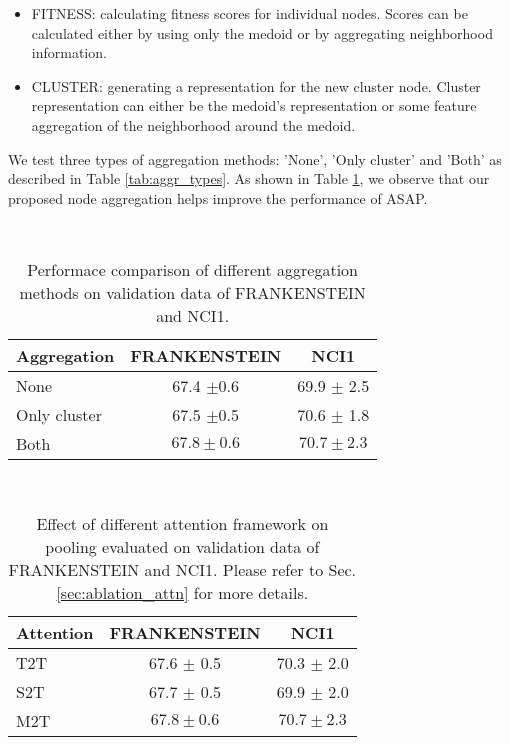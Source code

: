 \documentclass[letterpaper]{article} \usepackage{aaai20}  \usepackage{times}  \usepackage{helvet} \usepackage{courier}  \usepackage[hyphens]{url}  \usepackage{graphicx} \urlstyle{rm} \def\UrlFont{\rm}  \usepackage{graphicx}  \frenchspacing  \setlength{\pdfpagewidth}{8.5in}  \setlength{\pdfpageheight}{11in}
\begin{document}
\begin{itemize}
	\item FITNESS: calculating fitness scores for individual nodes. Scores can be calculated either by using only the medoid or by aggregating neighborhood information.
	\item CLUSTER: generating a representation for the new cluster node. Cluster representation can either be the medoid's representation or some feature aggregation of the neighborhood around the medoid.
\end{itemize}

\noindent We test three types of aggregation methods: 'None', 'Only cluster' and 'Both' as described in Table \ref{tab:aggr_types}. As shown in Table \ref{tab:aggregation}, we observe that our proposed node aggregation helps improve the performance of ASAP.

\begin{table}[!tbh]\
	\centering
	\begin{tabular}{lcc}
		\toprule
		Aggregation & \textsc{FRANKENSTEIN} & \textsc{NCI1} \\
		\midrule
		None & 67.4 $\pm$0.6 & 69.9 $\pm$ 2.5\\
		Only cluster & 67.5 $\pm$0.5 & 70.6 $\pm$ 1.8\\
		Both & $\mathbf{67.8 \pm 0.6}$ & $\mathbf{70.7 \pm 2.3}$ \\
		\bottomrule
	\end{tabular}
	\caption{\label{tab:aggregation} Performace comparison of different aggregation methods on validation data of FRANKENSTEIN and NCI1.}
\end{table}

\begin{table}[!tbh]\
	\centering
	\begin{tabular}{lcc}
		\toprule
		Attention & \textsc{FRANKENSTEIN} & \textsc{NCI1} \\
		\midrule
		T2T & 67.6 $\pm$ 0.5 & 70.3 $\pm$ 2.0 \\
		S2T & 67.7 $\pm$ 0.5 & 69.9 $\pm$ 2.0 \\
		M2T & $\mathbf{67.8 \pm 0.6}$ & $\mathbf{70.7 \pm 2.3}$ \\
		\bottomrule
	\end{tabular}
	\caption{\label{tab:attention} Effect of different attention framework on pooling evaluated on validation data of FRANKENSTEIN and NCI1. Please refer to Sec. \ref{sec:ablation_attn} for more details.}
\end{table}
\end{document}
